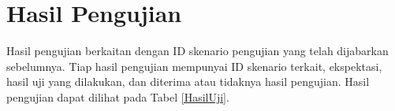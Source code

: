 \begin{small}
\begin{longtable}{ | p{2cm} | p{4cm} | p{7cm} | }
\end{longtable}
\end{small}

\section{Hasil Pengujian}
Hasil pengujian berkaitan dengan ID skenario pengujian yang telah dijabarkan sebelumnya. Tiap hasil pengujian mempunyai ID skenario terkait, ekspektasi, hasil uji yang dilakukan, dan diterima atau tidaknya hasil pengujian. Hasil pengujian dapat dilihat pada Tabel \ref{HasilUji}.

